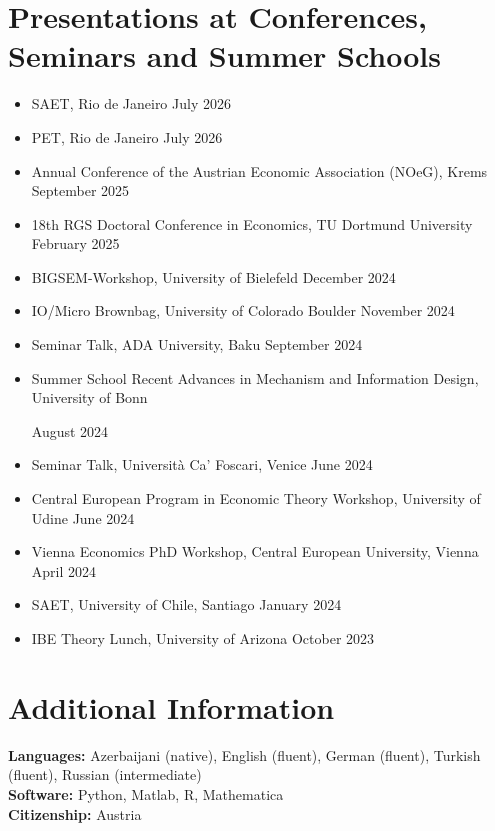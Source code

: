 \documentclass[11pt,letterpaper]{article}
\newcommand{\cvsection}[1]{%
  \Needspace{6\baselineskip}%
  \section*{#1}%
}
\begin{document}
\cvsection{Presentations at Conferences, Seminars and Summer Schools}
\begin{itemize}[label={}]
  \item SAET, Rio de Janeiro \hfill July 2026
  \item PET, Rio de Janeiro \hfill July 2026
  \item Annual Conference of the Austrian Economic Association (NOeG), Krems \hfill September 2025
  \item 18th RGS Doctoral Conference in Economics, TU Dortmund University \hfill February 2025
  \item BIGSEM-Workshop, University of Bielefeld \hfill December 2024
  \item IO/Micro Brownbag, University of Colorado Boulder \hfill November 2024
  \item Seminar Talk, ADA University, Baku \hfill September 2024
  \item
  \begin{minipage}[t]{0.78\textwidth}
    Summer School Recent Advances in Mechanism and Information Design, University of Bonn
  \end{minipage}%
  \hfill
  \begin{minipage}[t]{0.18\textwidth}
    \raggedleft August 2024
  \end{minipage}
  \item Seminar Talk, Universit\`a Ca' Foscari, Venice \hfill June 2024
  \item Central European Program in Economic Theory Workshop, University of Udine \hfill June 2024
  \item Vienna Economics PhD Workshop, Central European University, Vienna \hfill April 2024
  \item SAET, University of Chile, Santiago \hfill January 2024
  \item IBE Theory Lunch, University of Arizona \hfill October 2023
\end{itemize}

\cvsection{Additional Information}
\textbf{Languages:} Azerbaijani (native), English (fluent), German (fluent), Turkish (fluent), Russian (intermediate)\\
\textbf{Software:} Python, Matlab, R, Mathematica\\
\textbf{Citizenship:} Austria
\end{document}
